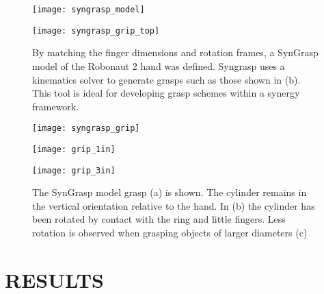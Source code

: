 \documentclass[letterpaper, 10 pt, conference]{ieeeconf}  %
\begin{document}
\begin{figure}[!b]%
\centering
\begin{minipage}{1.2in}%
      \texttt{[image: syngrasp\_model]}
     \subcaption{}
\end{minipage}%
\qquad
\begin{minipage}{0.05in}%

\end{minipage}%
\begin{minipage}{1.2in}%
      \texttt{[image: syngrasp\_grip\_top]}
      \subcaption{}
\end{minipage}%

\caption{By matching the finger dimensions and rotation frames, a SynGrasp model of the Robonaut 2 hand was defined.  Syngrasp uses a kinematics solver to generate grasps such as those shown in (b).  This tool is ideal for developing grasp schemes within a synergy framework. }%
\label{fig:models}%
\end{figure}


\begin{figure}%
\centering
\begin{minipage}{0.9in}%
      \texttt{[image: syngrasp\_grip]}
      \subcaption{}
\end{minipage}%
\qquad
\begin{minipage}{0.05in}%

\end{minipage}%
\begin{minipage}{0.9in}%
      \texttt{[image: grip\_1in]}
      \subcaption{}
\end{minipage}%
\qquad
\begin{minipage}{0.05in}%

\end{minipage}%
\begin{minipage}{0.9in}%
      \texttt{[image: grip\_3in]}
     \subcaption{}
\end{minipage}%
\caption{The SynGrasp model grasp (a) is shown.  The cylinder remains in the vertical orientation relative to the hand.  In (b) the cylinder has been rotated by contact with the ring and little fingers.  Less rotation is observed when grasping objects of larger diameters (c)}%
\label{rotatefig}%
\end{figure}

\section{RESULTS}
\label{results}
\end{document}
